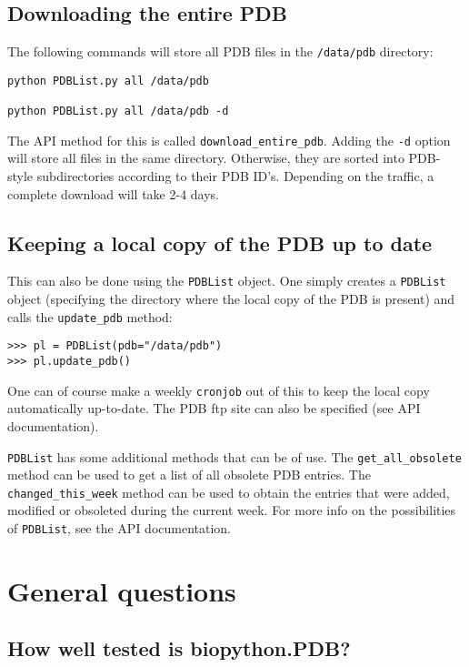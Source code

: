 \subsection{Downloading the entire PDB}

The following commands will store all PDB files in the \texttt{/data/pdb}
directory:

\begin{verbatim}
python PDBList.py all /data/pdb

python PDBList.py all /data/pdb -d
\end{verbatim}
\noindent The API method for this is called \texttt{download\_entire\_pdb}.
Adding the \texttt{-d} option will store all files in the same directory.
Otherwise, they are sorted into PDB-style subdirectories according
to their PDB ID's. Depending on the traffic, a complete download will
take 2-4 days.

\subsection{Keeping a local copy of the PDB up to date}

This can also be done using the \texttt{PDBList} object. One simply
creates a \texttt{PDBList} object (specifying the directory where
the local copy of the PDB is present) and calls the \texttt{update\_pdb}
method:

\begin{verbatim}
>>> pl = PDBList(pdb="/data/pdb")
>>> pl.update_pdb()
\end{verbatim}
One can of course make a weekly \texttt{cronjob} out of this to keep
the local copy automatically up-to-date. The PDB ftp site can also
be specified (see API documentation).

\texttt{PDBList} has some additional methods that can be of use. The
\texttt{get\_all\_obsolete} method can be used to get a list of all
obsolete PDB entries. The \texttt{changed\_this\_week} method can
be used to obtain the entries that were added, modified or obsoleted
during the current week. For more info on the possibilities of \texttt{PDBList},
see the API documentation.

\section{General questions}

\subsection{How well tested is biopython.PDB?}

